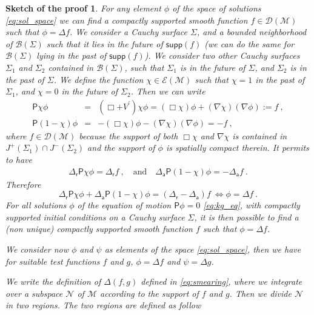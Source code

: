 \documentclass[11pt]{book}
\newcommand{\supp}{\mathsf{supp}}
\newcommand{\Bcal}{\mathcal{B}}
\newcommand{\Dcal}{\mathcal{D}}
\newcommand{\Ecal}{\mathcal{E}}
\newcommand{\Mcal}{\mathcal{M}}
\newcommand{\Ncal}{\mathcal{N}}
\newcommand{\Psf}{\mathsf{P}}
\newcommand{\asf}{\mathsf{a}}
\newcommand{\rsf}{\mathsf{r}}
\theoremstyle{break}
\newtheorem*{sketch}{Sketch of the proof}[chapter]
\begin{document}
\begin{sketch}
For any element $\phi$ of the space of solutions \eqref{eq:sol_space} we can find a compactly supported smooth function $f \in \Dcal(\Mcal)$ such that $\phi = \Delta f$. We consider a Cauchy surface $\Sigma$, and a bounded neighborhood of $\Bcal(\Sigma)$ such that it lies in the future of $\supp(f)$ (we can do the same for $\Bcal(\Sigma)$ lying in the past of $\supp(f)$). We consider two other Cauchy surfaces $\Sigma_1$ and $\Sigma_2$ contained in $\Bcal(\Sigma)$, such that $\Sigma_1$ is in the future of $\Sigma$, and $\Sigma_2$ is in the past of $\Sigma$. We define the function $\chi \in \Ecal(\Mcal)$ such that $\chi =1$ in the past of $\Sigma_1$, and $\chi = 0$ in the future of $\Sigma_2$. Then we can write
%
\begin{eqnarray*}
\Psf \chi \phi &=& (\Box + V^\prime) \chi \phi = (\Box \chi) \phi + (\nabla \chi) (\nabla \phi) := f \ , \\
\Psf (1- \chi)\phi &=& - (\Box \chi) \phi - (\nabla \chi) (\nabla \phi) = - f \ , 
\end{eqnarray*}
%
where $f \in \Dcal(\Mcal)$ because the support of both $\Box \chi$ and $\nabla \chi$ is contained in $J^+(\Sigma_1)\cap J^-(\Sigma_2)$ and the support of $\phi$ is spatially compact therein. It permits to have
%
\begin{eqnarray*}
\Delta_\rsf \Psf \chi \phi = \Delta_\rsf f \ , \quad \mbox{and} \quad  \Delta_\asf \Psf (1-\chi) \phi = - \Delta_\asf f \ .
\end{eqnarray*}
%
Therefore
%
\begin{equation*}
\Delta_\rsf \Psf \chi \phi + \Delta_\asf \Psf (1-\chi) \phi = (\Delta_\rsf - \Delta_\asf) f \ \Leftrightarrow \phi = \Delta f \ .
\end{equation*}
%
For all solutions $\phi$ of the equation of motion $\Psf \phi =0$ \eqref{eq:kg_eq}, with compactly supported initial conditions on a Cauchy surface $\Sigma$, it is then possible to find a (non unique) compactly supported smooth function $f$ such that $\phi = \Delta f$.\par%
%
We consider now $\phi$ and $\psi$ as elements of the space \eqref{eq:sol_space}, then we have for suitable test functions $f$ and $g$, $\phi=\Delta f$ and $\psi=\Delta g$.\par%
%
We write the definition of $\Delta(f,g)$ defined in \eqref{eq:smearing}, where we integrate over a subspace $\Ncal$ of $\Mcal$ according to the support of $f$ and $g$. Then we divide $\Ncal$ in two regions. The two regions are defined as follow

\end{sketch}
\end{document}
